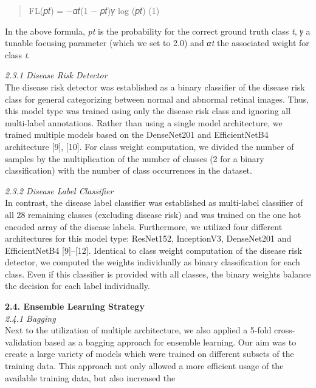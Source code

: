 \documentclass[
]{article}
\begin{document}
\begin{quote}
FL(𝑝𝑡) = −𝛼𝑡(1 − 𝑝𝑡)𝛾 log (𝑝𝑡) (1)
\end{quote}

In the above formula, \emph{pt} is the probability for the correct
ground truth class \emph{t}, \emph{γ} a tunable focusing parameter
(which we set to 2.0) and \emph{αt} the associated weight for class
\emph{t}.

\emph{2.3.1 Disease Risk Detector}\\
The disease risk detector was established as a binary classifier of the
disease risk class for general categorizing between normal and abnormal
retinal images. Thus, this model type was trained using only the disease
risk class and ignoring all multi-label annotations. Rather than using a
single model architecture, we trained multiple models based on the
DenseNet201 and EfficientNetB4 architecture {[}9{]}, {[}10{]}. For class
weight computation, we divided the number of samples by the
multiplication of the number of classes (2 for a binary classification)
with the number of class occurrences in the dataset.

\emph{2.3.2 Disease Label Classifier}\\
In contrast, the disease label classifier was established as multi-label
classifier of all 28 remaining classes (excluding disease risk) and was
trained on the one hot encoded array of the disease labels. Furthermore,
we utilized four different architectures for this model type: ResNet152,
InceptionV3, DenseNet201 and EfficientNetB4 {[}9{]}--{[}12{]}. Identical
to class weight computation of the disease risk detector, we computed
the weights individually as binary classification for each class. Even
if this classifier is provided with all classes, the binary weights
balance the decision for each label individually.

\textbf{2.4. Ensemble Learning Strategy}\\
\emph{2.4.1 Bagging}\\
Next to the utilization of multiple architecture, we also applied a
5-fold cross-validation based as a bagging approach for ensemble
learning. Our aim was to create a large variety of models which were
trained on different subsets of the training data. This approach not
only allowed a more efficient usage of the available training data, but
also increased the
\end{document}
